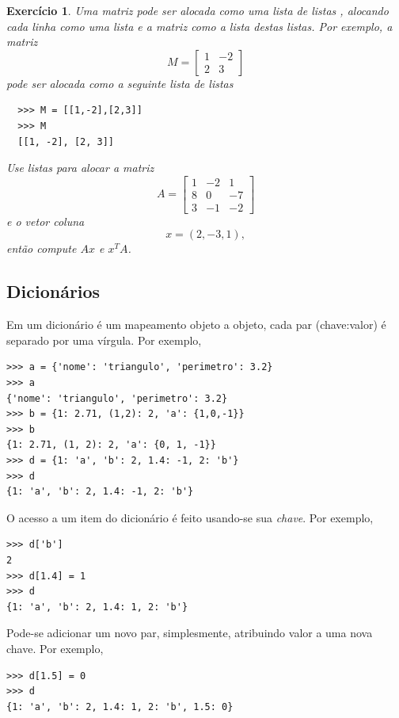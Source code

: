 \documentclass[12pt]{article}
\newtheorem{exr}{Exercício}[section]
\begin{document}
\begin{exr}
  Uma matriz pode ser alocada como uma lista de listas {\python}, alocando cada linha como uma lista e a matriz como a lista destas listas. Por exemplo, a matriz
  \begin{equation}
    M =
    \begin{bmatrix}
      1 & -2 \\
      2 & 3
    \end{bmatrix}
  \end{equation}
  pode ser alocada como a seguinte lista de listas
  \begin{lstlisting}
  >>> M = [[1,-2],[2,3]]
  >>> M
  [[1, -2], [2, 3]]
  \end{lstlisting}
  Use listas para alocar a matriz
  \begin{equation}
    A =
    \begin{bmatrix}
      1 & -2 & 1\\
      8 & 0 & -7\\
      3 & -1 & -2
    \end{bmatrix}
  \end{equation}
  e o vetor coluna
  \begin{equation}
    x = (2, -3, 1),
  \end{equation}
  então compute $Ax$ e $x^TA$.
\end{exr}

\subsection{Dicionários}

Em {\python} um dicionário é um mapeamento objeto a objeto, cada par (chave:valor) é separado por uma vírgula. Por exemplo,
\begin{lstlisting}
>>> a = {'nome': 'triangulo', 'perimetro': 3.2}
>>> a
{'nome': 'triangulo', 'perimetro': 3.2}
>>> b = {1: 2.71, (1,2): 2, 'a': {1,0,-1}}
>>> b
{1: 2.71, (1, 2): 2, 'a': {0, 1, -1}}
>>> d = {1: 'a', 'b': 2, 1.4: -1, 2: 'b'}
>>> d
{1: 'a', 'b': 2, 1.4: -1, 2: 'b'}
\end{lstlisting}

O acesso a um item do dicionário é feito usando-se sua \emph{chave}. Por exemplo,
\begin{lstlisting}
>>> d['b']
2
>>> d[1.4] = 1
>>> d
{1: 'a', 'b': 2, 1.4: 1, 2: 'b'}
\end{lstlisting}
Pode-se adicionar um novo par, simplesmente, atribuindo valor a uma nova chave. Por exemplo,
\begin{lstlisting}
>>> d[1.5] = 0
>>> d
{1: 'a', 'b': 2, 1.4: 1, 2: 'b', 1.5: 0}
\end{lstlisting}
\end{document}
